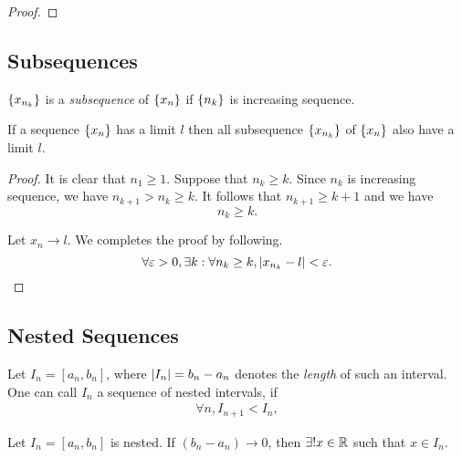 \begin{proof}

\end{proof}

\subsection{Subsequences}

\begin{definition}
  $\{x_{n_k}\}$ is a \emph{subsequence} of $\{x_n\}$ if $\{n_k\}$
  is increasing sequence.
  \label{def:sub}
\end{definition}

\begin{theorem}
  If a sequence $\{x_n\}$ has a limit $l$ then all subsequence
  $\{x_{n_k}\}$ of $\{x_n\}$ also have a limit $l$.
  \label{thm:sub_limit}
\end{theorem}

\begin{proof}
  It is clear that $n_1 \ge 1$. Suppose that $n_k
    \ge k$. Since $n_k$ is increasing sequence, we have $n_{k+1} > n_k \ge k$. It
  follows that $n_{k+1} \ge k + 1$ and we have
  \begin{equation}
    n_k \ge k.
  \end{equation}

  Let $x_n \to l$. We completes the proof by following.
  \begin{equation}
    \forall \varepsilon > 0, \exists k: \forall n_k \ge k, \left| x_{n_k} - l \right| < \varepsilon.
  \end{equation}
\end{proof}


\subsection{Nested Sequences}

\begin{definition}
  Let $I_n = [a_n, b_n]$, where $\left| I_n \right| = b_n - a_n$ denotes the
  \emph{length} of such an interval. One can call $I_n$ a sequence of nested
  intervals, if
  \begin{equation}
    \begin{split}
      \forall n, I_{n + 1} < I_n,
    \end{split}
  \end{equation}
  \label{def:nest}
\end{definition}

\begin{theorem} 
  Let $I_n = [a_n, b_n]$ is nested. If $(b_n - a_n) \to 0$, then $\exists! x \in
    \mathbb{R}$ such that $x \in I_n$.
  \label{thm:nest_int}
\end{theorem}

